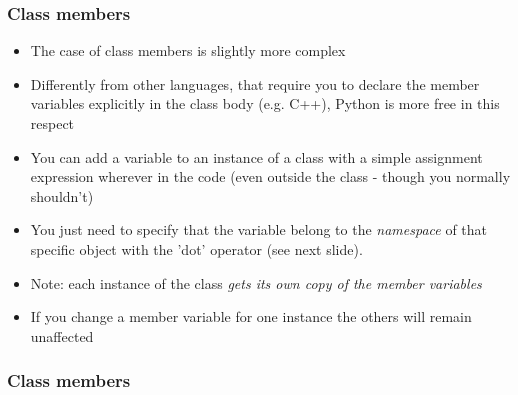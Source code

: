 \documentclass[9pt]{beamer}
\begin{document}
\begin{frame}
  \frametitle{Class members}
  
  \begin{itemize}
    \small
    \item The case of class members is slightly more complex
    \medskip
    \item Differently from other languages, that require you to declare the member
          variables explicitly in the class body (e.g. C++), Python is more free
          in this respect
    \medskip
    \item You can add a variable to an instance of a class with a simple 
          assignment expression wherever in the code (even outside the class
          - though you normally shouldn't)
    \medskip
    \item You just need to specify that the variable 
          belong to the \emph{namespace} of that specific object with the 'dot' operator
          (see next slide).
    \medskip
    \item Note: each instance of the class \emph{gets its own copy of the member variables}
    \smallskip
    \item If you change a member variable for one instance the others will remain unaffected
    
  \end{itemize}
  
\end{frame}


\begin{frame}
  \frametitle{Class members}
  
\end{frame}
\end{document}
